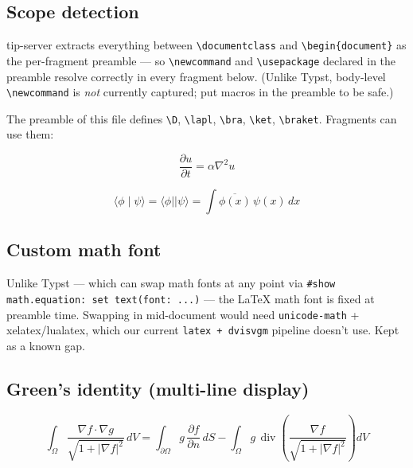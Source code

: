 \documentclass{article}
\newcommand{\D}[2]{\frac{\partial #1}{\partial #2}}
\newcommand{\lapl}{\nabla^2}
\newcommand{\bra}[1]{\langle #1\rvert}
\newcommand{\ket}[1]{\lvert #1\rangle}
\newcommand{\braket}[2]{\langle #1 \mid #2\rangle}
\begin{document}
\subsection*{Scope detection}

tip-server extracts everything between \verb|\documentclass| and
\verb|\begin{document}| as the per-fragment preamble --- so
\verb|\newcommand| and \verb|\usepackage| declared in the preamble
resolve correctly in every fragment below.  (Unlike Typst, body-level
\verb|\newcommand| is \emph{not} currently captured; put macros in
the preamble to be safe.)

The preamble of this file defines \verb|\D|, \verb|\lapl|,
\verb|\bra|, \verb|\ket|, \verb|\braket|.  Fragments can use them:

\[ \D{u}{t} = \alpha \lapl u \]

\[ \braket{\phi}{\psi} = \bra{\phi}\ket{\psi}
     = \int \overline{\phi(x)}\,\psi(x)\,dx \]

\subsection*{Custom math font}

Unlike Typst --- which can swap math fonts at any point via
\verb|#show math.equation: set text(font: ...)| --- the LaTeX math
font is fixed at preamble time.  Swapping in mid-document would need
\verb|unicode-math| + xelatex/lualatex, which our current
\texttt{latex + dvisvgm} pipeline doesn't use.  Kept as a known gap.

\subsection*{Green's identity (multi-line display)}

\begin{equation*}
  \int_\Omega
    \frac{\nabla f \cdot \nabla g}{\sqrt{1 + \lvert\nabla f\rvert^2}}
    \, dV
  = \int_{\partial \Omega}
    g\, \frac{\partial f}{\partial n}\, dS
  - \int_\Omega
    g\, \operatorname{div}
    \!\!\left(\frac{\nabla f}{\sqrt{1 + \lvert\nabla f\rvert^2}}\right)
    dV
\end{equation*}
\end{document}
